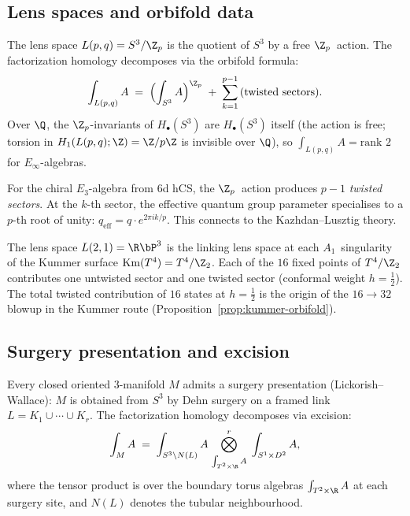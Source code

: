 \subsection{Lens spaces and orbifold data}
\label{subsec:lens-space-chiral}

The lens space $L(p,q) = S^3/\Z_p$ is the quotient of $S^3$ by a free $\Z_p$~action. The factorization homology decomposes via the orbifold formula:
\[
 \int_{L(p,q)} A \;=\; \Bigl(\int_{S^3} A\Bigr)^{\Z_p} \;+\; \sum_{k=1}^{p-1} \text{(twisted sectors)}.
\]
Over $\Q$, the $\Z_p$-invariants of $H_\bullet(S^3)$ are $H_\bullet(S^3)$ itself (the action is free; torsion in $H_1(L(p,q); \Z) = \Z/p\Z$ is invisible over $\Q$), so $\int_{L(p,q)} A = \text{rank } 2$ for $E_\infty$-algebras.

For the chiral $E_3$-algebra from $6$d hCS, the $\Z_p$~action produces $p-1$ \emph{twisted sectors}. At the $k$-th sector, the effective quantum group parameter specialises to a $p$-th root of unity: $q_{\mathrm{eff}} = q \cdot e^{2\pi i k/p}$. This connects to the Kazhdan--Lusztig theory.

\begin{remark}[Kummer connection: \texorpdfstring{$L(2,1) = \R\bP^3$}{L(2,1) = RP-3}]
\label{rem:lens-kummer-connection}
The lens space $L(2,1) = \R\bP^3$ is the linking lens space at each $A_1$~singularity of the Kummer surface $\mathrm{Km}(T^4) = T^4/\Z_2$. Each of the $16$ fixed points of $T^4/\Z_2$ contributes one untwisted sector and one twisted sector (conformal weight $h = \tfrac{1}{2}$). The total twisted contribution of $16$ states at $h = \tfrac{1}{2}$ is the origin of the $16 \to 32$ blowup in the Kummer route (Proposition~\ref{prop:kummer-orbifold}).
\end{remark}

\subsection{Surgery presentation and excision}
\label{subsec:surgery-excision}

Every closed oriented $3$-manifold $M$ admits a surgery presentation (Lickorish--Wallace): $M$ is obtained from $S^3$ by Dehn surgery on a framed link $L = K_1 \cup \cdots \cup K_r$. The factorization homology decomposes via excision:
\[
 \int_M A \;=\; \int_{S^3 \setminus N(L)} A \;\underset{\int_{T^2 \times \R} A}{\bigotimes^r}\; \int_{S^1 \times D^2} A,
\]
where the tensor product is over the boundary torus algebras $\int_{T^2 \times \R} A$ at each surgery site, and $N(L)$ denotes the tubular neighbourhood.

